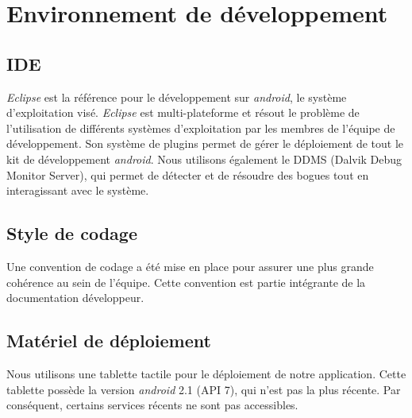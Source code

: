 \section{Environnement de développement}

\subsection{IDE}
\emph{Eclipse} est la référence pour le développement sur \emph{android}, le système d'exploitation visé. \emph{Eclipse} est multi-plateforme et résout le problème de l'utilisation de différents systèmes d'exploitation par les membres de l'équipe de développement.
Son système de plugins permet de gérer le déploiement de tout le kit de développement \emph{android}. Nous utilisons également le DDMS (Dalvik Debug Monitor Server), qui permet de détecter et de résoudre des bogues tout en interagissant avec le système. 

\subsection{Style de codage}
Une convention de codage a été mise en place pour assurer une plus grande cohérence au sein de l'équipe. Cette convention est partie intégrante de la documentation développeur.

\subsection{Matériel de déploiement}
Nous utilisons une tablette tactile pour le déploiement de notre application. Cette tablette possède la version \emph{android} 2.1 (API 7), qui n'est pas la plus récente. Par conséquent, certains services récents ne sont pas accessibles.


